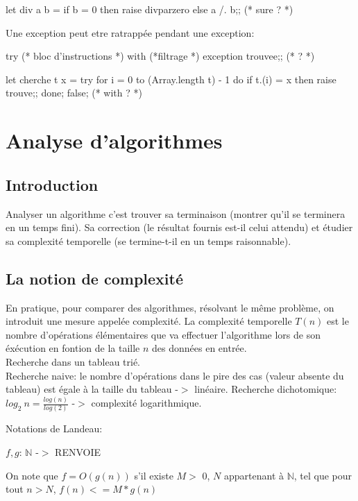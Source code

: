 \documentclass{article}
\begin{document}
			\begin{case}
let div a b = 
	if b = 0 then raise divparzero else a /. b;; (* sure ? *)
			\end{case}

			Une exception peut etre ratrappée pendant une exception: 
			\begin{case}
try 
	(* bloc d'instructions *)
with
	(*filtrage *)
exception trouvee;; (* ? *)

let cherche t x = 
	try
		for i = 0 to (Array.length t) - 1 do
			if t.(i) = x then raise trouve;;
		done;
	false;
	(* with ? *)
			\end{case}

		\section{Analyse d'algorithmes}
			\subsection{Introduction}

				Analyser un algorithme c'est trouver sa terminaison (montrer qu'il se terminera en un temps fini).  
				Sa correction (le résultat fournis est-il celui attendu) et étudier sa complexité temporelle (se termine-t-il en un temps raisonnable).

			\subsection{La notion de complexité}
			
				En pratique, pour comparer des algorithmes, résolvant le même problème, on introduit une mesure appelée complexité.
				La complexité temporelle $T(n)$ est le nombre d'opérations élémentaires que va effectuer l'algorithme lors de son éxécution en fontion de la taille $n$ des données en entrée.\\
				Recherche dans un tableau trié.\\
				Recherche naive: le nombre d'opérations dans le pire des cas (valeur absente du tableau) est égale à la taille du tableau -$>$ linéaire.
				Recherche dichotomique: $log_2\ n = \frac{log(n)}{log(2)}$ -$>$ complexité logarithmique.

				Notations de Landeau:

				$f, g$: $\mathbb{N}$ -$>$ RENVOIE %
 
				On note que $f = O(g(n))$ s'il existe $M >$ 0, $N$ appartenant à $\mathbb{N}$, tel que pour tout $n > N$, $f(n) <= M * g(n)$
\end{document}
